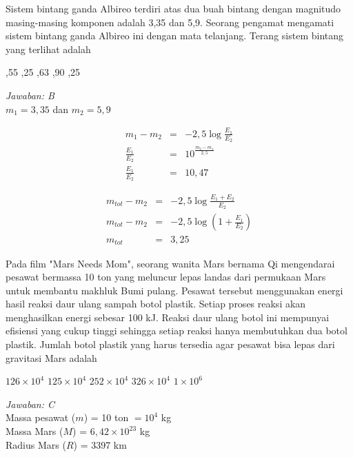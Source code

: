 \documentclass[11pt,fleqn, a4paper]{exam}
\begin{document}
\begin{questions}
\question Sistem bintang ganda Albireo terdiri atas dua buah bintang dengan magnitudo masing-masing komponen adalah 3,35 dan 5,9. Seorang pengamat mengamati sistem bintang ganda Albireo ini dengan mata telanjang. Terang sistem bintang yang terlihat adalah
\begin{choices}
,55
,25
,63
,90
,25
\end{choices}

\textit{Jawaban: B}\\
$m_1=3,35$ dan $m_2=5,9$

\vspace{-0.75cm}
\begin{minipage}[t]{0.5\textwidth}
\begin{eqnarray*}
m_1-m_2&=&-2,5\log \frac{E_1}{E_2}\\
\frac{E_1}{E_2}&=&10^{\frac{m_2-m_1}{2,5}}\\
\frac{E_1}{E_2}&=&10,47
\end{eqnarray*}
\end{minipage}
\begin{minipage}[t]{0.5\textwidth}
\begin{eqnarray*}
m_{tot}-m_2&=&-2,5\log \frac{E_1+E_2}{E_2}\\
m_{tot}-m_2&=&-2,5\log \left(1+\frac{E_1}{E_2} \right)\\
m_{tot}&=&3,25
\end{eqnarray*}
\end{minipage}

\vspace{0.5cm}
\question Pada film "Mars Needs Mom", seorang wanita Mars bernama Qi mengendarai pesawat bermassa 10 ton yang meluncur lepas landas dari permukaan Mars untuk membantu makhluk Bumi pulang. Pesawat tersebut menggunakan energi hasil reaksi daur ulang sampah botol plastik. Setiap proses reaksi akan menghasilkan energi sebesar 100 kJ. Reaksi daur ulang botol ini mempunyai efisiensi yang cukup tinggi sehingga setiap reaksi hanya membutuhkan dua botol plastik. Jumlah botol plastik yang harus tersedia agar pesawat bisa lepas dari gravitasi Mars adalah

\begin{choices}
\choice $126\times 10^4$
\choice $125\times 10^4$
\choice $252\times 10^4$
\choice $326\times 10^4$
\choice $1\times 10^6$
\end{choices}

\textit{Jawaban: C}\\
Massa pesawat ($m$) = 10 ton $ = 10^4$ kg\\
Massa Mars ($M$) = $6,42 \times 10^{23}$ kg\\
Radius Mars ($R$) = 3397 km


\end{questions}
\end{document}
